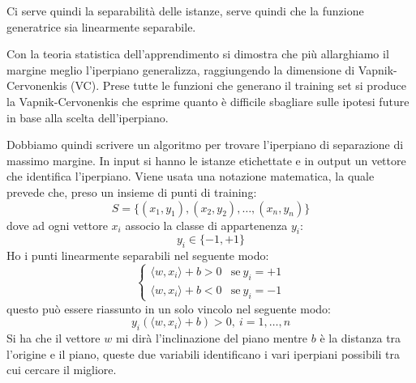 Ci serve quindi la separabilità delle istanze, serve quindi che la funzione generatrice sia linearmente separabile.
\begin{teorema}
    Con la teoria statistica dell'apprendimento si dimostra che più allarghiamo il margine meglio l'iperpiano generalizza, raggiungendo la dimensione di Vapnik-Cervonenkis (VC). Prese tutte le funzioni che generano il training set si produce la Vapnik-Cervonenkis che esprime quanto è difficile sbagliare sulle ipotesi future in base alla scelta dell'iperpiano.
\end{teorema}
Dobbiamo quindi scrivere un algoritmo per trovare l'iperpiano di separazione di massimo margine. In input si hanno le istanze etichettate e in output un vettore che identifica l'iperpiano. Viene usata una notazione matematica, la quale prevede che, preso un insieme di punti di training:
\begin{equation}
    S = \{(x_1, y_1), (x_2, y_2),\dots, (x_n, y_n)\}
\end{equation}
dove ad ogni vettore $x_i$ associo la classe di appartenenza $y_i$:
\begin{equation}
    y_i \in \{-1, +1\}
\end{equation}
Ho i punti linearmente separabili nel seguente modo:
\begin{equation}
    \begin{cases}
        \langle w, x_i \rangle + b > 0 & \text{se} \ y_i = +1 \\
         \langle w, x_i \rangle + b < 0 & \text{se} \ y_i = -1
    \end{cases}
\end{equation}
questo può essere riassunto in un solo vincolo nel seguente modo:
\begin{equation}
    y_i(\langle w, x_i\rangle + b) > 0, \  i = 1,\dots, n
\end{equation}
Si ha che il vettore $w$ mi dirà l'inclinazione del piano mentre $b$ è la distanza tra l'origine e il piano, queste due variabili identificano i vari iperpiani possibili tra cui cercare il migliore.

